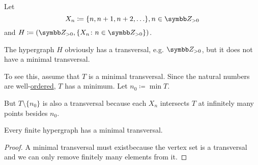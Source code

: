\begin{example}\label{ex:no_minimal_set_transversal}
  Let
  \begin{equation*}
    X_n \coloneqq \{ n, n + 1, n + 2, \ldots \}, n \in \BZ_{>0}
  \end{equation*}
  and \( H \coloneqq (\BZ_{>0}, \{ X_n \colon n \in \BZ_{>0} \}) \).

  The hypergraph \( H \) obviously has a transversal, e.g. \( \BZ_{>0} \), but it does not have a minimal transversal.

  To see this, assume that \( T \) is a minimal transversal. Since the natural numbers are well-\hyperref[thm:natural_numbers_are_well_ordered]{ordered}, \( T \) has a minimum. Let \( n_0 \coloneqq \min T \).

  But \( T \setminus \{ n_0 \} \) is also a transversal because each \( X_n \) intersects \( T \) at infinitely many points besides \( n_0 \).
\end{example}

\begin{proposition}\label{thm:finite_hypergraphs_have_minimal_transversal}
  Every finite hypergraph has a minimal transversal.
\end{proposition}
\begin{proof}
  A minimal transversal must exist\LEM because the vertex set is a transversal and we can only remove finitely many elements from it.
\end{proof}
